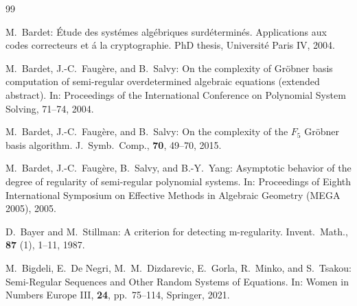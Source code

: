 \documentclass{article}
\theoremstyle{definition}
\theoremstyle{plain}
\theoremstyle{plain}
\theoremstyle{plain}
\theoremstyle{plain}
\numberwithin{equation}{subsection}
\begin{document}
\renewcommand{\baselinestretch}{0.85} 
\begin{thebibliography}{99}


M.\ Bardet:
\'Etude des syst\'emes alg\'ebriques surd\'etermin\'es. 
Applications aux codes correcteurs et \'a la cryptographie. 
PhD thesis, Universit\'e Paris IV, 2004.

M.\ Bardet, J.-C.\ Faug\`{e}re, and B.\ Salvy:
On the complexity of Gr\"{o}bner basis computation of semi-regular overdetermined algebraic equations (extended abstract). 
In: Proceedings of the International Conference on Polynomial System Solving, 71--74, 2004.

M.\ Bardet, J.-C.\ Faug\`{e}re, and B.\ Salvy:
On the complexity of the $F_5$ Gr\"{o}bner basis algorithm.
J.\ Symb.\ Comp., {\bf 70}, 49--70, 2015.

M.\ Bardet, J.-C.\ Faug\`{e}re, B.\ Salvy, and B.-Y.\ Yang:
Asymptotic behavior of the degree of regularity of semi-regular polynomial systems.
In: Proceedings of Eighth International Symposium on Effective Methods in Algebraic Geometry (MEGA 2005), 2005.

D.\ Bayer and M.\ Stillman:
A criterion for detecting m-regularity.
Invent.\ Math., {\bf 87} (1), 1--11, 1987.




M.\ Bigdeli, E.\ De Negri, M.\ M.\ Dizdarevic, E.\ Gorla, R.\ Minko, and S.\ Tsakou:
Semi-Regular Sequences and Other Random Systems of Equations.
In: Women in Numbers Europe III, {\bf 24}, pp.\ 75--114, Springer, 2021.


\end{thebibliography}
\end{document}
